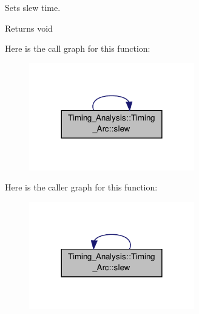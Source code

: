 Sets slew time. 

\begin{DoxyReturn}{Returns}
void 
\end{DoxyReturn}


Here is the call graph for this function\-:\nopagebreak
\begin{figure}[H]
\begin{center}
\leavevmode
\includegraphics[width=204pt]{classTiming__Analysis_1_1Timing__Arc_a5521ea0890331cb77e6b0ea72a7062a3_cgraph}
\end{center}
\end{figure}




Here is the caller graph for this function\-:\nopagebreak
\begin{figure}[H]
\begin{center}
\leavevmode
\includegraphics[width=204pt]{classTiming__Analysis_1_1Timing__Arc_a5521ea0890331cb77e6b0ea72a7062a3_icgraph}
\end{center}
\end{figure}




